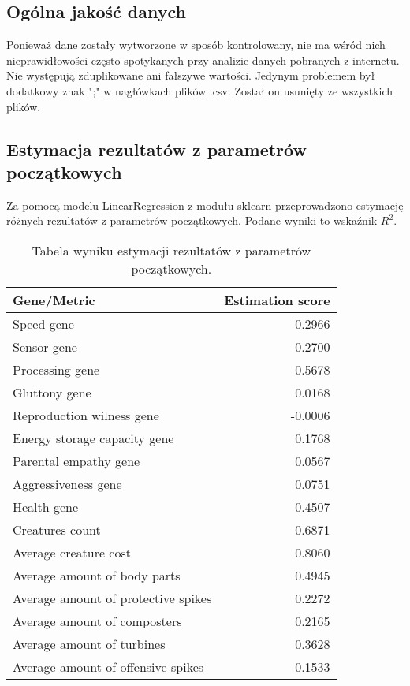 \documentclass{article}
\begin{document}
\subsection{Ogólna jakość danych}
Ponieważ dane zostały wytworzone w sposób kontrolowany, nie ma wśród nich nieprawidłowości często spotykanych przy analizie danych pobranych z internetu. Nie występują zduplikowane ani fałszywe wartości. Jedynym problemem był dodatkowy znak ";" w nagłówkach plików .csv. Został on usunięty ze wszystkich plików.

\subsection{Estymacja rezultatów z parametrów początkowych}
Za pomocą modelu \href{https://scikit-learn.org/stable/modules/generated/sklearn.linear_model.LinearRegression.html}{LinearRegression z modułu sklearn} przeprowadzono estymację różnych rezultatów z parametrów początkowych. Podane wyniki to wskaźnik \( R^2 \).
\begin{table}[H]
    \centering
    \begin{tabular}{lr}
        \toprule
        \textbf{Gene/Metric} & \textbf{Estimation score} \\
        \midrule
        Speed gene & 0.2966 \\
        Sensor gene & 0.2700 \\
        Processing gene & 0.5678 \\
        Gluttony gene & 0.0168 \\
        Reproduction wilness gene & -0.0006 \\
        Energy storage capacity gene & 0.1768 \\
        Parental empathy gene & 0.0567 \\
        Aggressiveness gene & 0.0751 \\
        Health gene & 0.4507 \\
        Creatures count & 0.6871 \\
        Average creature cost & 0.8060 \\
        Average amount of body parts & 0.4945 \\
        Average amount of protective spikes & 0.2272 \\
        Average amount of composters & 0.2165 \\
        Average amount of turbines & 0.3628 \\
        Average amount of offensive spikes & 0.1533 \\        
        \bottomrule
    \end{tabular}
    \caption{Tabela wyniku estymacji rezultatów z parametrów początkowych.}
\end{table}
\end{document}
